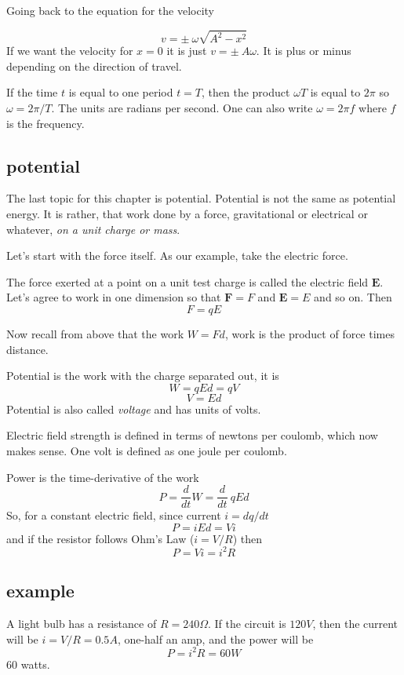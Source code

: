 \documentclass[11pt, oneside]{article}
\begin{document}
Going back to the equation for the velocity

\[ v = \pm \ \omega \sqrt{A^2 - x^2} \]
If we want the velocity for $x = 0$ it is just $v = \pm \ A \omega$.
It is plus or minus depending on the direction of travel.

If the time $t$ is equal to one period $t = T$, then the product $\omega T$ is equal to $2 \pi$ so $\omega = 2 \pi / T$.  The units are radians per second.  One can also write $\omega = 2 \pi f$ where $f$ is the frequency.

\subsection*{potential}

The last topic for this chapter is potential.  Potential is not the same as potential energy.  It is rather, that work done by a force, gravitational or electrical or whatever, \emph{on a unit charge or mass}.

Let's start with the force itself.  As our example, take the electric force.

The force exerted at a point on a unit test charge is called the electric field $\mathbf{E}$.  Let's agree to work in one dimension so that $\mathbf{F} = F$ and $\mathbf{E} = E$ and so on.  Then
\[ F = qE \]

Now recall from above that the work $W = Fd$, work is the product of force times distance.  

Potential is the work with the charge separated out, it is
\[ W = qEd = qV \]
\[ V = Ed \]
Potential is also called \emph{voltage} and has units of volts.

Electric field strength is defined in terms of newtons per coulomb, which now makes sense.  One volt is defined as one joule per coulomb.

Power is the time-derivative of the work
\[ P = \frac{d}{dt} W = \frac{d}{dt} \ qEd \]
So, for a constant electric field, since current $i = dq/dt$
\[ P = iEd = Vi \]
and if the resistor follows Ohm's Law ($i = V/R$) then
\[ P = Vi = i^2 R \]

\subsection*{example}
A light bulb has a resistance of $R = 240 \Omega$.  If the circuit is $120 V$, then the current will be $i = V/R = 0.5 A$, one-half an amp, and the power will be
\[ P = i^2 R = 60 W \]
60 watts.
\end{document}
